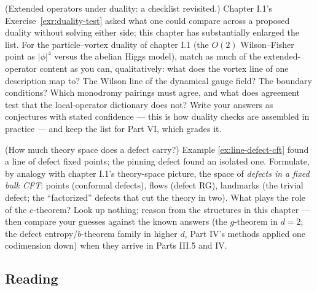 \begin{exercise}[thinker]
\label{exr:duality-defects-web}
(Extended operators under duality: a checklist revisited.) Chapter
I.1's Exercise~\ref{exr:duality-test} asked what one could compare
across a proposed duality without solving either side; this chapter
has substantially enlarged the list. For the particle--vortex duality
of chapter I.1 (the $O(2)$ Wilson--Fisher point as $|\phi|^4$ versus
the abelian Higgs model), match as much of the extended-operator
content as you can, qualitatively: what does the vortex line of one
description map to? The Wilson line of the dynamical gauge field? The
boundary conditions? Which monodromy pairings must agree, and what
does agreement test that the local-operator dictionary does not?
Write your answers as conjectures with stated confidence --- this is
how duality checks are assembled in practice --- and keep the list for
Part VI, which grades it.
\end{exercise}

\begin{exercise}[thinker]
\label{exr:defect-rg-monotone}
(How much theory space does a defect carry?) Example
\ref{ex:line-defect-cft} found a line of defect fixed points; the
pinning defect found an isolated one. Formulate, by analogy with
chapter I.1's theory-space picture, the space of \emph{defects in a
fixed bulk CFT}: points (conformal defects), flows (defect RG),
landmarks (the trivial defect; the ``factorized'' defects that cut
the theory in two). What plays the role of the $c$-theorem? Look up
nothing; reason from the structures in this chapter --- then compare
your guesses against the known answers (the $g$-theorem in $d=2$;
the defect entropy/$b$-theorem family in higher $d$, Part IV's
methods applied one codimension down) when they arrive in Parts III.5
and IV.
\end{exercise}

\subsection*{Reading}

